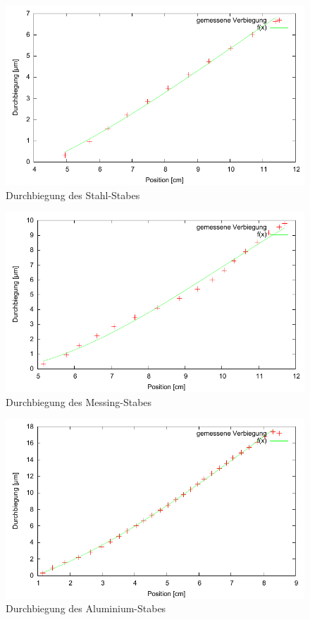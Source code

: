\begin{figure}[H]
 \includegraphics[width=\textwidth]{Graphen/biegung-balken1.pdf}
 \caption{Durchbiegung des Stahl-Stabes}
\end{figure}

\begin{figure}[H]
 \includegraphics[width=\textwidth]{Graphen/biegung-balken2.pdf}
 \caption{Durchbiegung des Messing-Stabes}
\end{figure}

\begin{figure}[H]
 \includegraphics[width=\textwidth]{Graphen/biegung-balken3.pdf}
 \caption{Durchbiegung des Aluminium-Stabes}
\end{figure}

